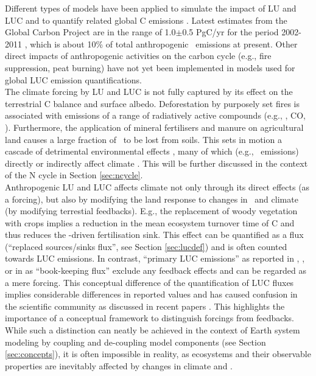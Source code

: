 Different types of models have been applied to simulate the impact of LU and LUC and to quantify related global C emissions \citep{houghton12bg,baccini12,harris12,houghton12bg}. Latest estimates from the Global Carbon Project are in the range of 1.0$\pm$0.5 PgC/yr for the period 2002-2011 \citep{lequere13essd}, which is about 10\% of total anthropogenic \coo\ emissions at present. Other direct impacts of anthropogenic activities on the carbon cycle (e.g., fire suppression, peat burning) have not yet been implemented in models used for global LUC emission quantifications. \\

The climate forcing by LU and LUC is not fully captured by its effect on the terrestrial C balance and surface albedo. Deforestation by purposely set fires is associated with emissions of a range of radiatively active compounds (e.g., \chh , CO, \nox ). Furthermore, the application of mineral fertilisers and manure on agricultural land causes a large fraction of \nr\ to be lost from soils. This sets in motion a cascade of detrimental environmental effects \citep{galloway03}, many of which (e.g., \nno\ emissions) directly or indirectly affect climate \citep{erisman11}. This will be further discussed in the context of the N cycle in Section \ref{sec:ncycle}.\\

Anthropogenic LU and LUC affects climate not only through its direct effects (as a forcing), but also by modifying the land response to changes in \coo\ and climate (by modifying terrestial feedbacks). E.g., the replacement of woody vegetation with crops implies a reduction in the mean ecosystem turnover time of C and thus reduces the \coo -driven fertilisation sink. This effect can be quantified as a flux (``replaced sources/sinks flux'', see Section \ref{sec:lucdef}) and is often counted towards LUC emissions. In contrast, ``primary LUC emissions'' as reported in \citet{pongratz09}, \citet{stocker11bg}, or in \citet{strassmann08tel} as ``book-keeping flux'' exclude any feedback effects and can be regarded as a mere forcing. This conceptual difference of the quantification of LUC fluxes implies considerable differences in reported values and has caused confusion in the scientific community as discussed in recent papers \citet{pongratz13, gasserciais13}. This highlights the importance of a conceptual framework to distinguish forcings from feedbacks. While such a distinction can neatly be achieved in the context of Earth system modeling by coupling and de-coupling model components (see Section \ref{sec:concepts}), it is often impossible in reality, as ecosystems and their observable properties are inevitably affected by changes in climate and \coo .\\

